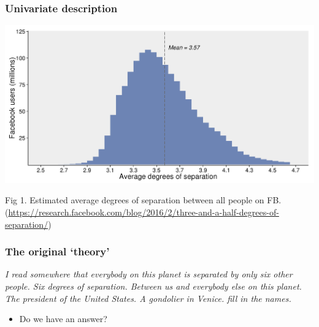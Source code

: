 \documentclass[aspectratio=43]{beamer}
\begin{document}
\begin{frame}
\frametitle{Univariate description}
\centering

\includegraphics[width = \textwidth]{../img/facebook_separation}

{\footnotesize Fig 1. Estimated average degrees of separation between all people on FB.}
{\tiny (\url{https://research.facebook.com/blog/2016/2/three-and-a-half-degrees-of-separation/})}

\end{frame}

\begin{frame}
\frametitle{The original `theory'}
\centering

\textit{I read somewhere that everybody on this planet is separated by only six other people. Six degrees of separation. Between us and everybody else on this planet. The president of the United States. A gondolier in Venice. fill in the names.}\\\vspace{10pt}{\small Six Degrees of Separation, John Guare}

\vspace{20pt}

\begin{itemize}
  \item Do we have an answer?
\end{itemize}

\end{frame}
\end{document}
